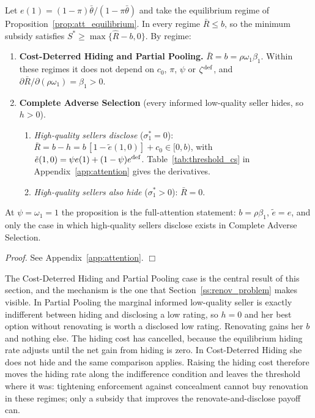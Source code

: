 \documentclass[10pt,letterpaper]{bp-template-concise}
\begin{document}
\begin{proposition}
\label{prop:threshold}
Let $e(1)=(1-\pi)\bar\theta/(1-\pi\bar\theta)$ and take the equilibrium regime of Proposition~\ref{prop:att_equilibrium}. In every regime $\bar R\le b$, so the minimum subsidy satisfies $S^*\ge\max\{\hat R-b,0\}$. By regime:
\begin{enumerate}[label=(\roman*)]
    \item \textbf{Cost-Deterred Hiding and Partial Pooling.} $\bar R=b=\rho\omega_1\beta_1$. Within these regimes it does not depend on $c_0$, $\pi$, $\psi$ or $\zeta^{\rm def}$, and $\partial\bar R/\partial(\rho\omega_1)=\beta_1>0$.
    \item \textbf{Complete Adverse Selection} (every informed low-quality seller hides, so $h>0$).
    \begin{enumerate}[label=(\alph*)]
        \item \emph{High-quality sellers disclose} ($\sigma_1^*=0$): $\bar R=b-h=b\,[1-\tilde e(1,0)]+c_0\in[0,b)$, with $\tilde e(1,0)=\psi e(1)+(1-\psi)e^{\rm def}$. Table~\ref{tab:threshold_cs} in Appendix~\ref{app:attention} gives the derivatives.
        \item \emph{High-quality sellers also hide} ($\sigma_1^*>0$): $\bar R=0$.
    \end{enumerate}
\end{enumerate}
At $\psi=\omega_1=1$ the proposition is the full-attention statement: $b=\rho\beta_1$, $\tilde e=e$, and only the case in which high-quality sellers disclose exists in Complete Adverse Selection.
\end{proposition}

\noindent\textit{Proof.} See Appendix~\ref{app:attention}. $\Box$

\medskip

The Cost-Deterred Hiding and Partial Pooling case is the central result of this section, and the mechanism is the one that Section~\ref{ss:renov_problem} makes visible. In Partial Pooling the marginal informed low-quality seller is exactly indifferent between hiding and disclosing a low rating, so $h=0$ and her best option without renovating is worth a disclosed low rating. Renovating gains her $b$ and nothing else. The hiding cost has cancelled, because the equilibrium hiding rate adjusts until the net gain from hiding is zero. In Cost-Deterred Hiding she does not hide and the same comparison applies. Raising the hiding cost therefore moves the hiding rate along the indifference condition and leaves the threshold where it was: tightening enforcement against concealment cannot buy renovation in these regimes; only a subsidy that improves the renovate-and-disclose payoff can.
\end{document}
